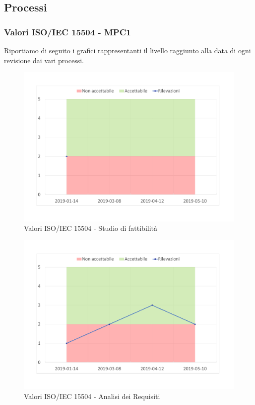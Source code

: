 \subsection{Processi}
\subsubsection{Valori ISO/IEC 15504 - MPC1}

Riportiamo di seguito i grafici rappresentanti il livello raggiunto alla data di ogni revisione dai vari processi.


\begin{figure}[H]
	\centering
	\includegraphics[scale=0.6]{images/resoconto/Studio.pdf}
	\caption{Valori ISO/IEC 15504 - Studio di fattibilità}	
\end{figure}


\begin{figure}[H]
	\centering
	\includegraphics[scale=0.6]{images/resoconto/Analisi.pdf}
	\caption{Valori ISO/IEC 15504 - Analisi dei Requisiti}	
\end{figure}


